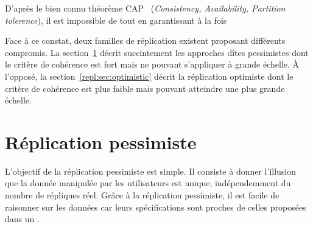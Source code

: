 D'après le bien connu théorème CAP~\cite{gilbert2002brewer} (\emph{Consistency,
  Availability, Partition tolerence}), il est impossible de  tout en garantissant à la fois 

Face à ce constat, deux familles de réplication existent proposant différents
compromis. La section~\ref{repl:sec:pessimistic} décrit succintement les
approches dîtes pessimistes dont le critère de cohérence est fort mais ne
pouvant s'appliquer à grande échelle. À l'opposé, la
section~\ref{repl:sec:optimistic} décrit la réplication optimiste dont le
critère de cohérence est plus faible mais pouvant atteindre une plus grande
échelle.

\section{Réplication pessimiste}
\label{repl:sec:pessimistic}

L'objectif de la réplication pessimiste est simple. Il consiste à donner
l'illusion que la donnée manipulée par les utilisateurs est unique,
indépendemment du nombre de répliques réel. Grâce à la réplication pessimiste,
il est facile de raisonner sur les données car leurs spécifications sont proches
de celles proposées dans un .

